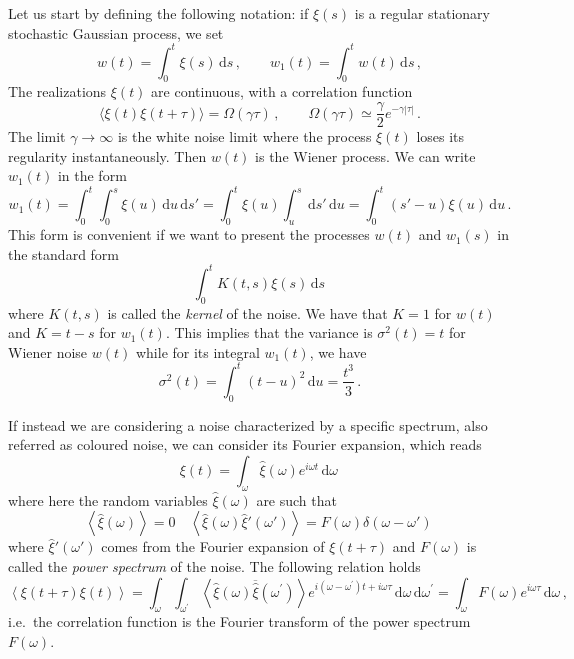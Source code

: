 Let us start by defining the following notation: if $\xi(s)$ is a regular stationary stochastic Gaussian process, we set
\begin{equation}
	w(t) = \int_0^t \xi(s)\,\mathrm{d}s \,, \qquad w_1(t)=\int_0^t w(t)\,\mathrm{d}s \,,
\end{equation}
The realizations $\xi(t)$ are continuous, with a correlation function 
\begin{equation}
    \langle\xi(t)\xi(t+\tau)\rangle = \Omega(\gamma\tau) \,,\qquad \Omega(\gamma\tau) \simeq \frac{\gamma}{2}e^{-\gamma|\tau|}\,.
\end{equation}
The limit $\gamma\to\infty$ is the white noise limit where the process $\xi(t)$ loses its regularity instantaneously. Then $w(t)$ is the Wiener process. We can write \(w_1(t)\) in the form
\begin{equation}
	w_1(t) = \int_0^t \int_0^s \xi(u)\,\mathrm{d}u\,\mathrm{d}s' = \int_0^t \xi(u)\int_u^s\,\mathrm{d}s'\,\mathrm{d}u = \int_0^t (s'-u)\xi(u)\,\mathrm{d}u \,.
\end{equation}
This form is convenient if we want to present the processes \(w(t)\) and \(w_1(s)\) in the standard form 
\begin{equation}
	\int_0^t K(t,s)\xi(s)\,\mathrm{d}s \,
\end{equation}
where \(K(t,s)\) is called the \textit{kernel} of the noise. We have that \(K=1\) for \(w(t)\) and \(K=t-s\) for \(w_1(t)\). This implies that the variance is \(\sigma^2(t) = t\) for Wiener noise \(w(t)\) while for its integral \(w_1(t)\), we have
\begin{equation}
	\sigma^2(t) = \int_0^t (t-u)^2\,\mathrm{d}u = \frac{t^3}{3} \,.
\end{equation}

If instead we are considering a noise characterized by a specific spectrum, also referred as coloured noise, we can consider its Fourier expansion, which reads
\begin{equation}
    \xi(t) = \int_\omega \hat{\xi}(\omega)e^{i\omega t}\,\mathrm{d}\omega\,
\end{equation}
where here the random variables $\hat{\xi}(\omega)$ are such that
\begin{equation}
    \left\langle \hat{\xi}(\omega) \right\rangle = 0 \quad \left\langle \hat{\xi}(\omega)\hat{\xi}'(\omega') \right\rangle = F(\omega)\delta(\omega - \omega')\,
\end{equation}
where $\hat{\xi}'(\omega')$ comes from the Fourier expansion of $\xi(t+\tau)$ and $F(\omega)$ is called the \textit{power spectrum} of the noise. The following relation holds
\begin{equation}
    \left\langle\xi(t+\tau) \xi(t)\right\rangle=\int_\omega \int_{\omega^{\prime}} \left\langle\hat{\xi}(\omega) \overline{\hat{\xi}}\left(\omega^{\prime}\right)\right\rangle e^{i\left(\omega-\omega^{\prime}\right) t+i \omega \tau} \,\mathrm{d} \omega \,\mathrm{d} \omega^{\prime}=\int_\omega F(\omega) e^{i \omega \tau} \,\mathrm{d} \omega\,,
\end{equation}
i.e.\ the correlation function is the Fourier transform of the power spectrum $F(\omega)$.

